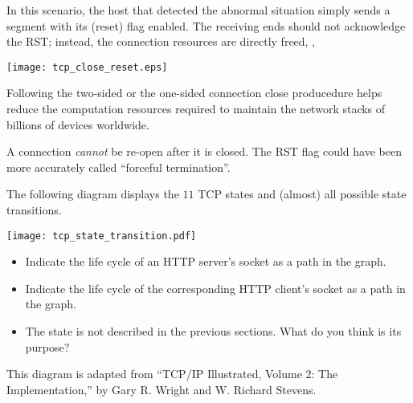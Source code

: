 In this scenario, the host that detected the abnormal situation simply sends a segment 
with its  (reset) flag enabled. The receiving ends should not acknowledge
the RST; instead, the connection resources are directly freed, \eg,

\begin{center}
\texttt{[image: tcp\_close\_reset.eps]} 
\end{center}

Following the two-sided or the one-sided connection close producedure helps reduce the 
computation resources required to maintain the network stacks of billions of devices worldwide.

\begin{remark}
A connection \textit{cannot} be re-open after it is closed. The RST flag could have been 
more accurately called ``forceful termination''.
\end{remark}

\begin{exercise}
The following diagram displays the $11$ TCP states and (almost) 
all possible state transitions.

\begin{center}
 \texttt{[image: tcp\_state\_transition.pdf]}
\end{center}

\begin{itemize}
\item Indicate the life cycle of an HTTP server's socket as a path in the graph.
\item Indicate the life cycle of the corresponding HTTP client's socket as a path in the graph.
\item The  state is not described in the previous sections. 
  What do you think is its purpose?
\end{itemize}

\begin{remark}
 This diagram is adapted from ``TCP/IP Illustrated, Volume 2: The Implementation,''
by Gary R. Wright and W. Richard Stevens.
\end{remark}


\end{exercise}
